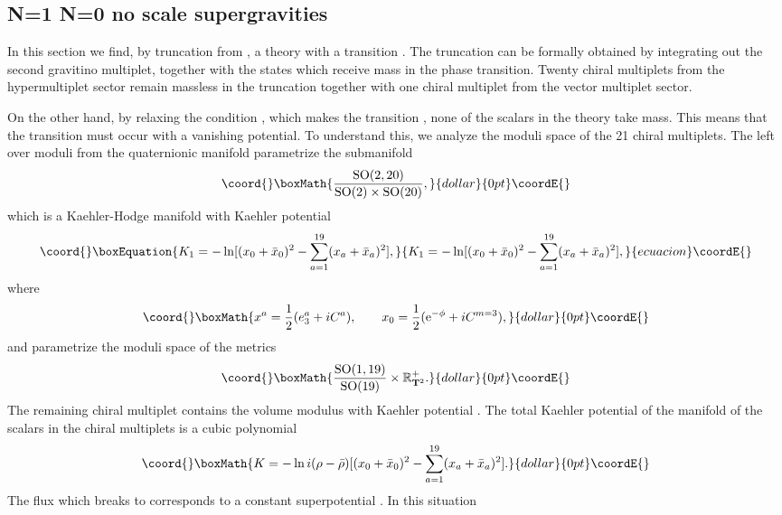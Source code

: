 \documentclass[a4paper,12pt]{article}
\begin{document}
\subsection{ N=1 \myHighlight{$\to$}\coordHE{} N=0 no scale supergravities}
In this section we find, by truncation from \coordHE{}, a \coordHE{} theory
with a transition \coordHE{} \cite{fpo}. The truncation \coordHE{} can be formally obtained by integrating out the second
gravitino multiplet, together with the states which receive mass
in the \coordHE{} phase transition. Twenty chiral multiplets
from the hypermultiplet sector remain massless in the truncation
together with one chiral multiplet from the vector multiplet
sector.

On the other hand, by relaxing the condition \coordHE{}, which
makes the transition \coordHE{}, none of the scalars in the
\coordHE{} theory take mass. This means that the \coordHE{}
transition must occur with a vanishing potential. To understand
this, we analyze the moduli space of the 21 chiral multiplets. The
left over moduli from the quaternionic manifold parametrize the
submanifold
$$\coord{}\boxMath{\frac {\rSO(2,20)}{\rSO(2)\times \rSO(20)},}{dollar}{0pt}\coordE{}$$
which is a Kaehler-Hodge manifold with Kaehler potential
\begin{equation}\coord{}\boxEquation{K_1=-\ln[(x_0+\bar x_0)^2-\sum_{a=1}^{19}(x_a+\bar
x_a)^2],\label{k1}}{K_1=-\ln[(x_0+\bar x_0)^2-\sum_{a=1}^{19}(x_a+\bar
x_a)^2],}{ecuacion}\coordE{}\end{equation} where
$$\coord{}\boxMath{x^a=\frac 12(e^a_3+iC^a), \qquad x_0=\frac 12(\mathrm{e}^{-\phi}+iC^{m=3}),}{dollar}{0pt}\coordE{}$$
and \coordHE{} parametrize the moduli space of the metrics
$$\coord{}\boxMath{\frac {\rSO(1,19)}{\rSO(19)}\times \R^+_{\T^2}.}{dollar}{0pt}\coordE{}$$
The remaining chiral multiplet contains the \myHighlight{$\K$}\coordHE{} volume modulus
with Kaehler potential \coordHE{}. The
total Kaehler potential of the manifold of the scalars in the
chiral multiplets is a cubic polynomial
$$\coord{}\boxMath{K=-\ln i(\rho-\bar \rho)[(x_0+\bar x_0)^2-\sum_{a=1}^{19}(x_a+\bar
x_a)^2].}{dollar}{0pt}\coordE{}$$ The flux which breaks \coordHE{} to \coordHE{} corresponds to a
constant superpotential \coordHE{}. In this situation
\end{document}
